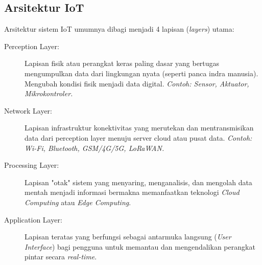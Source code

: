 \subsection{Arsitektur IoT}
Arsitektur sistem IoT umumnya dibagi menjadi 4 lapisan (\textit{layers}) utama:

\begin{center}
\end{center}

\begin{description}
    \item[Perception Layer:] Lapisan fisik atau perangkat keras paling dasar yang bertugas mengumpulkan data dari lingkungan nyata (seperti panca indra manusia). Mengubah kondisi fisik menjadi data digital. \textit{Contoh: Sensor, Aktuator, Mikrokontroler.}
    \item[Network Layer:] Lapisan infrastruktur konektivitas yang merutekan dan mentransmisikan data dari perception layer menuju server cloud atau pusat data. \textit{Contoh: Wi-Fi, Bluetooth, GSM/4G/5G, LoRaWAN.}
    \item[Processing Layer:] Lapisan "otak" sistem yang menyaring, menganalisis, dan mengolah data mentah menjadi informasi bermakna memanfaatkan teknologi \textit{Cloud Computing} atau \textit{Edge Computing}.
    \item[Application Layer:] Lapisan teratas yang berfungsi sebagai antarmuka langsung (\textit{User Interface}) bagi pengguna untuk memantau dan mengendalikan perangkat pintar secara \textit{real-time}.
\end{description}

